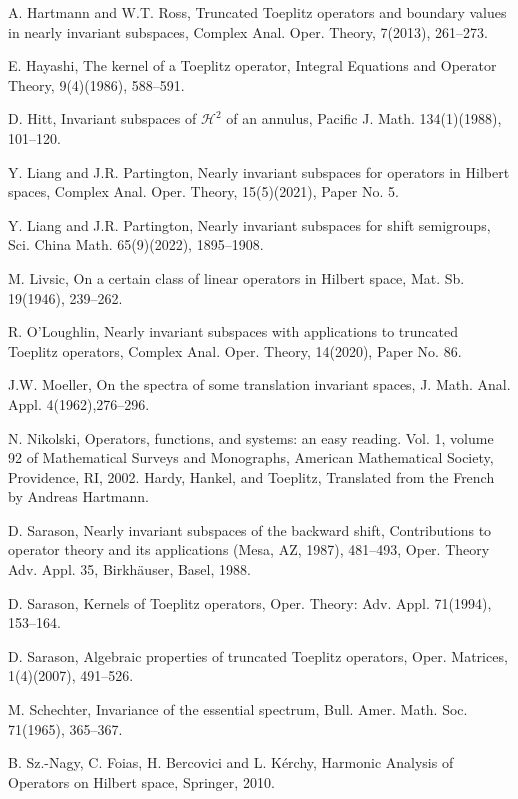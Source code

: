 \documentclass[12pt,reqno]{amsart}
\theoremstyle{definition}
\theoremstyle{remark}
\numberwithin{equation}{section}
\newcommand{\ma}{\mathcal}
\begin{document}
\begin{thebibliography}{}
A. Hartmann and W.T. Ross, Truncated Toeplitz operators and boundary values in nearly invariant subspaces, Complex Anal. Oper. Theory, 7(2013), 261--273.

 E. Hayashi, The kernel of a  Toeplitz operator, Integral Equations and Operator Theory, 9(4)(1986), 588--591.

 D. Hitt, Invariant subspaces of ${\ma H}^2$ of an annulus, Pacific J. Math. 134(1)(1988), 101--120.

 Y. Liang and J.R. Partington, Nearly invariant subspaces for operators in Hilbert spaces, Complex Anal. Oper. Theory, 15(5)(2021), Paper No. 5.

 Y. Liang and J.R. Partington, Nearly invariant subspaces for shift semigroups,  Sci. China Math.  65(9)(2022), 1895--1908.

M. Livsic, On a certain class of linear operators in Hilbert space, Mat. Sb. 19(1946), 239--262.

 R. O'Loughlin, Nearly invariant subspaces with applications to truncated Toeplitz operators, Complex Anal. Oper. Theory, 14(2020),  Paper No. 86.

 J.W. Moeller,  On the spectra of some translation invariant spaces,  J. Math. Anal. Appl. 4(1962),276--296.

 N. Nikolski, Operators, functions, and systems: an easy reading. Vol. 1, volume 92 of Mathematical Surveys and Monographs, American Mathematical Society, Providence, RI, 2002. Hardy, Hankel, and Toeplitz, Translated from the French by Andreas Hartmann.

 D. Sarason, Nearly invariant subspaces of the backward shift, Contributions to operator theory and its applications (Mesa, AZ, 1987), 481--493, Oper. Theory Adv. Appl. 35, Birkh\"{a}user, Basel, 1988.

 D. Sarason, Kernels of Toeplitz operators, Oper. Theory: Adv. Appl. 71(1994), 153--164.

 D. Sarason, Algebraic properties of truncated Toeplitz operators, Oper. Matrices, 1(4)(2007), 491--526.

 M. Schechter, Invariance of the essential spectrum, Bull. Amer. Math. Soc. 71(1965), 365--367.

 B. Sz.-Nagy, C. Foias, H. Bercovici and L. K\'{e}rchy,  Harmonic Analysis of Operators on Hilbert space, Springer, 2010.
\end{thebibliography}
\end{document}
